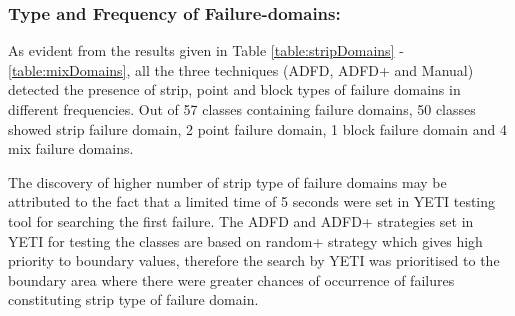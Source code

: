 



\subsubsection{Type and Frequency of Failure-domains:}
As evident from the results given in Table \ref{table:stripDomains} - \ref{table:mixDomains}, all the three techniques (ADFD, ADFD+ and Manual) detected the presence of strip, point and block types of failure domains in different frequencies. Out of 57 classes containing failure domains, 50 classes showed strip failure domain, 2 point failure domain, 1 block failure domain and 4 mix failure domains.  

The discovery of higher number of strip type of failure domains may be attributed to the fact that a limited time of 5 seconds were set in YETI testing tool for searching the first failure. The ADFD and ADFD+ strategies set in YETI for testing the classes are based on random+ strategy which gives high priority to boundary values, therefore the search by YETI was prioritised to the boundary area where there were greater chances of occurrence of failures constituting strip type of failure domain.



